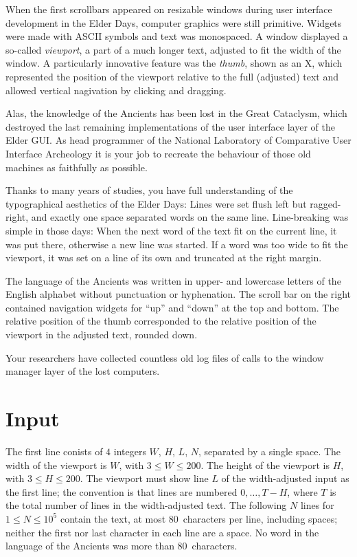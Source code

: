 
When the first scrollbars appeared on resizable windows during user interface development in the Elder Days, computer graphics were still primitive.
Widgets were made with ASCII symbols and text was monospaced.
A window displayed a so-called \emph{viewport}, a part of a much longer text, adjusted to fit the width of the window.
A particularly innovative feature was the \emph{thumb}, shown as an X, which represented the position of the viewport relative to the full (adjusted) text and allowed vertical nagivation by clicking and dragging.

Alas, the knowledge of the Ancients has been lost in the Great Cataclysm, which destroyed the last remaining implementations of the user interface layer of the Elder GUI. 
As head programmer of the National Laboratory of Comparative User Interface Archeology it is your job to recreate the behaviour of those old machines as faithfully as possible.

Thanks to many years of studies, you have full understanding of the typographical aesthetics of the Elder Days:
Lines were set flush left but ragged-right, and exactly one space separated words on the same line. 
Line-breaking was simple in those days: When the next word of the text fit on the current line, it was put there, otherwise a new line was started.
If a word was too wide to fit the viewport, it was set on a line of its own and truncated at the right margin.

The language of the Ancients was written in upper- and lowercase letters of the English alphabet without punctuation or hyphenation.
The scroll bar on the right contained navigation widgets for ``up'' and ``down'' at the top and bottom. 
The relative position of the thumb corresponded to the relative position of the viewport in the adjusted text, rounded down.

Your researchers have collected countless old log files of calls to the window manager layer of the lost computers.

\section*{Input}

The first line conists of $4$ integers $W$, $H$, $L$, $N$, separated by a single space.
The width of the viewport is $W$, with $3\leq W\leq 200$.
The height of the viewport is $H$, with $3\leq H\leq 200$.
The viewport must show line $L$ of the width-adjusted input as the first line; the convention is that lines are numbered $0,\ldots, T-H$, where $T$ is the total number of lines in the width-adjusted text.
The following $N$ lines for $1\leq N\leq 10^5$ contain the text, at most 80~characters per line, including spaces; neither the first nor last character in each line are a space. 
No word in the language of the Ancients was more than 80~characters.


